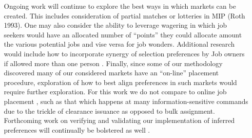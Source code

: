 Ongoing work will continue to explore the best ways in which markets can be created. This includes consideration of partial matches or lotteries in MIP (Roth 1993). One may also consider the ability to leverage wagering in which job seekers would have an allocated number of “points” they could allocate amount the various potential jobs and vise versa for job wonders. \cite{2011_Budish} Additional research would include how to incorporate synergy of selection preferences by Job owners if allowed more than one person \cite{1985_Roth_b}.  Finally, since some of our methodology discovered many of our considered markets have an “on-line” placement procedure, exploration of how to best align preferences in such markets would require further exploration. For this work we do not compare to online job placement \cite{1994_Khuller}, such as that which happens at many information-sensitive commands due to the trickle of clearance issuance as opposed to bulk assignment. Forthcoming work on verifying and validating our implementation of inferred preferences will continually be bolstered as well \cite{2019_Shaw}.












